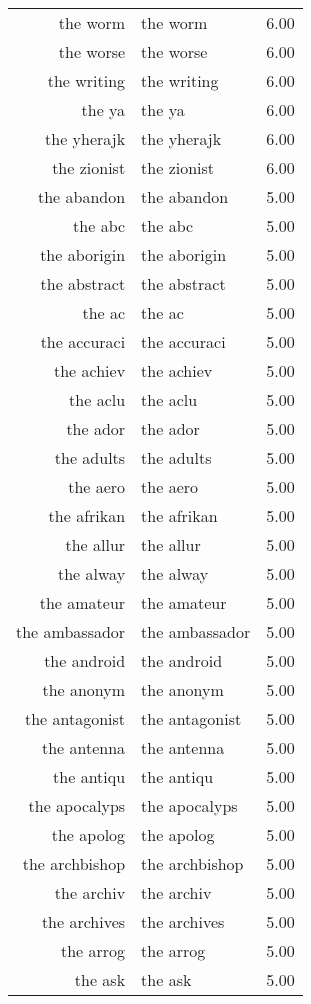 \begin{table}[ht]
\begin{tabular}{rlr}
  the worm & the worm & 6.00 \\ 
  the worse & the worse & 6.00 \\ 
  the writing & the writing & 6.00 \\ 
  the ya & the ya & 6.00 \\ 
  the yherajk & the yherajk & 6.00 \\ 
  the zionist & the zionist & 6.00 \\ 
  the abandon & the abandon & 5.00 \\ 
  the abc & the abc & 5.00 \\ 
  the aborigin & the aborigin & 5.00 \\ 
  the abstract & the abstract & 5.00 \\ 
  the ac & the ac & 5.00 \\ 
  the accuraci & the accuraci & 5.00 \\ 
  the achiev & the achiev & 5.00 \\ 
  the aclu & the aclu & 5.00 \\ 
  the ador & the ador & 5.00 \\ 
  the adults & the adults & 5.00 \\ 
  the aero & the aero & 5.00 \\ 
  the afrikan & the afrikan & 5.00 \\ 
  the allur & the allur & 5.00 \\ 
  the alway & the alway & 5.00 \\ 
  the amateur & the amateur & 5.00 \\ 
  the ambassador & the ambassador & 5.00 \\ 
  the android & the android & 5.00 \\ 
  the anonym & the anonym & 5.00 \\ 
  the antagonist & the antagonist & 5.00 \\ 
  the antenna & the antenna & 5.00 \\ 
  the antiqu & the antiqu & 5.00 \\ 
  the apocalyps & the apocalyps & 5.00 \\ 
  the apolog & the apolog & 5.00 \\ 
  the archbishop & the archbishop & 5.00 \\ 
  the archiv & the archiv & 5.00 \\ 
  the archives & the archives & 5.00 \\ 
  the arrog & the arrog & 5.00 \\ 
  the ask & the ask & 5.00 \\ 

\end{tabular}
\end{table}

